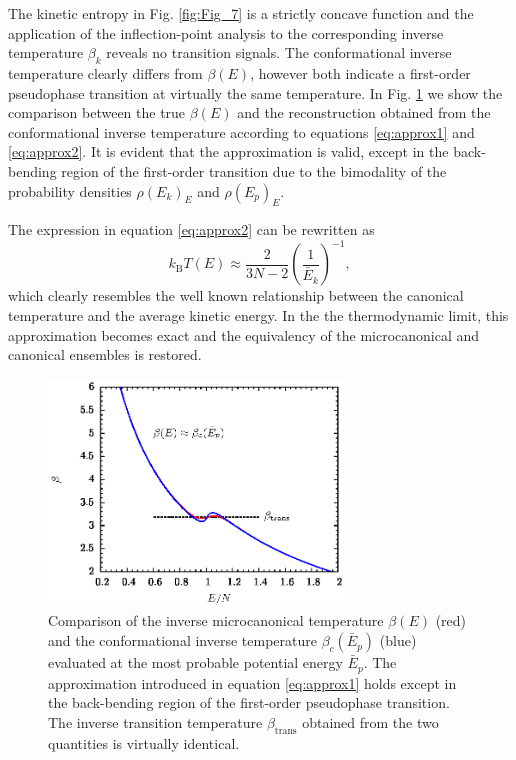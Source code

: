 \documentclass[12pt]{report}
\begin{document}
The kinetic entropy in Fig. \ref{fig:Fig_7} is a strictly concave function and the application of the inflection-point analysis to the corresponding inverse temperature $\beta_{k}$ reveals no transition signals. The conformational inverse temperature clearly differs from $\beta(E)$, however both indicate a first-order pseudophase transition at virtually the same temperature. In Fig. \ref{fig:Fig_8} we show the comparison between the true $\beta(E)$ and the reconstruction obtained from the conformational inverse temperature according to equations \ref{eq:approx1} and \ref{eq:approx2}. It is evident that the approximation is valid, except in the back-bending region of the first-order transition due to the bimodality of the probability densities $\rho(E_{k})_{E}$ and $\rho(E_{p})_{E}$. 

\newpage
The expression in equation \ref{eq:approx2} can be rewritten as 
\begin{equation}
k_{\mathrm{B}}T(E) \approx \frac{2}{3N-2}\left(\frac{1}{\bar{E}_{k}}\right)^{-1},
\end{equation}
which clearly resembles the well known relationship between the canonical temperature and the average kinetic energy. In the the thermodynamic limit, this approximation becomes exact and the equivalency of the microcanonical and canonical ensembles is restored. 



\begin{figure}
\center
\includegraphics[width = 0.7\textwidth]{chapter2Figs/N55BetaComp.eps}
\caption{\label{fig:Fig_8}%
Comparison of the inverse microcanonical temperature $\beta(E)$ (red) and the conformational inverse temperature $\beta_{c}(\bar{E}_{p})$ (blue) evaluated at the most probable potential energy $\bar{E}_{p}$. The approximation introduced in equation \ref{eq:approx1} holds except in the back-bending region of the first-order pseudophase transition. The inverse transition temperature $\beta_{\mathrm{trans}}$ obtained from the two quantities is virtually identical.}
\end{figure}
\end{document}
